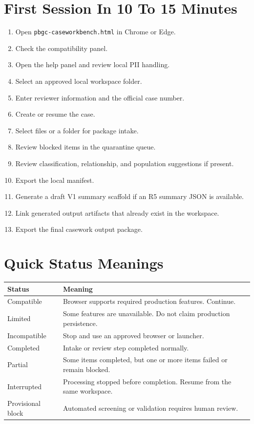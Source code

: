 \section{First Session In 10 To 15 Minutes}

\begin{enumerate}
  \item Open \texttt{pbgc-caseworkbench.html} in Chrome or Edge.
  \item Check the compatibility panel.
  \item Open the help panel and review local PII handling.
  \item Select an approved local workspace folder.
  \item Enter reviewer information and the official case number.
  \item Create or resume the case.
  \item Select files or a folder for package intake.
  \item Review blocked items in the quarantine queue.
  \item Review classification, relationship, and population suggestions if present.
  \item Export the local manifest.
  \item Generate a draft V1 summary scaffold if an R5 summary JSON is available.
  \item Link generated output artifacts that already exist in the workspace.
  \item Export the final casework output package.
\end{enumerate}

\section{Quick Status Meanings}

\begin{longtable}{L{0.25\textwidth}L{0.65\textwidth}}
\toprule
\textbf{Status} & \textbf{Meaning} \\
\midrule
Compatible & Browser supports required production features. Continue. \\
Limited & Some features are unavailable. Do not claim production persistence. \\
Incompatible & Stop and use an approved browser or launcher. \\
Completed & Intake or review step completed normally. \\
Partial & Some items completed, but one or more items failed or remain blocked. \\
Interrupted & Processing stopped before completion. Resume from the same workspace. \\
Provisional block & Automated screening or validation requires human review. \\
\bottomrule
\end{longtable}

